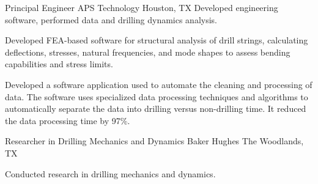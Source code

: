\documentclass{leresume}
\begin{document}
            {Principal Engineer}
            {APS Technology}
			{Houston, TX}
			Developed engineering software, performed data and drilling dynamics analysis.\nolinebreak[4]
		\begin{bulletedlist}
			
		\item
		
				Developed FEA-based software for structural analysis of drill strings, calculating deflections, stresses, natural frequencies, and mode shapes to assess bending capabilities and stress limits.
			
		\item
		
				Developed a software application used to automate the cleaning and processing of data.  The software uses specialized data processing techniques 
				and algorithms to automatically separate the data into drilling versus non-drilling time.  It reduced the data processing time by 97\%.
			
		\end{bulletedlist}
	
            {Researcher in Drilling Mechanics and Dynamics}
            {Baker Hughes}
			{The Woodlands, TX}
			
			Conducted research in drilling mechanics and dynamics.
		
\end{document}
